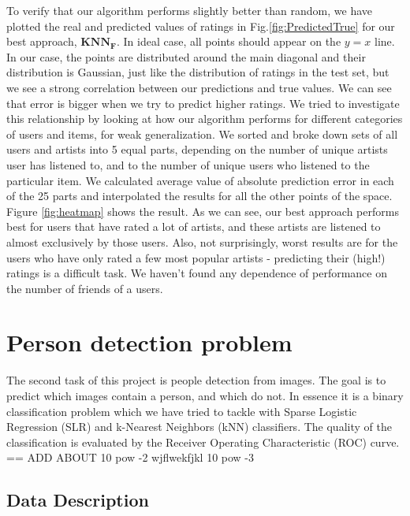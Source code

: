 \documentclass{article} %
\begin{document}
To verify that our algorithm performs slightly better than random, we have
plotted the real and predicted values of ratings in Fig.\ref{fig:PredictedTrue}
for our best approach, $\bm{KNN_F}$.
In ideal case, all points should appear on the $y=x$ line. 
In our case, the points are distributed around the main diagonal and their distribution is Gaussian, 
just like the distribution of ratings in the test set, but we see a strong
correlation between our predictions and true values. We can see that error is
bigger when we try to predict higher ratings. We tried to
investigate this relationship by looking at how our algorithm performs for
different categories of users and items, for weak generalization.
We sorted and broke down
sets of all users and artists into 5 equal parts, depending on the number of
unique artists user has listened to, and to the number of unique users who listened to the particular item.
We calculated average value of absolute prediction error in each of the 25 parts
and interpolated the results for all the other points of the space. Figure
\ref{fig:heatmap} shows the result. As we can see, our best approach performs
best for users that have rated a lot of artists, and these artists are listened
to almost exclusively by those users. Also, not surprisingly, worst results are
for the users who have only rated a few most popular artists - predicting their
(high!) ratings is a difficult task. We haven't found any
dependence of performance on the number of friends of a users.

\section{Person detection problem}

The second task of this project is people detection from images. The goal is to predict which images contain 
a person, and which do not. In essence it is a binary classification problem which we have tried to tackle 
with Sparse Logistic Regression (SLR) and k-Nearest Neighbors (kNN) classifiers.
The quality of the classification is evaluated by the Receiver Operating Characteristic (ROC) curve. == ADD  ABOUT 10 pow -2 wjflwekfjkl 10 pow -3


\subsection{Data Description}
\end{document}

